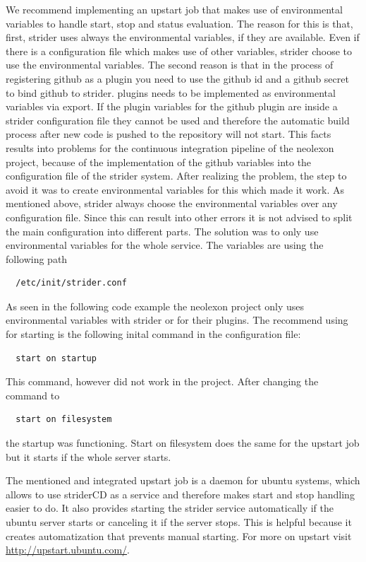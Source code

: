 We recommend implementing an upstart job that makes use of environmental variables to handle start, stop and status evaluation.
The reason for this is that, first, strider uses always the environmental variables, if they are available. Even if there is a configuration
file which makes use of other variables, strider choose to use the environmental variables. The second reason is that in the process of
registering github as a plugin you need to use the github id and a github secret to bind github to strider. plugins needs to be implemented
as environmental variables via export. If the plugin variables for the github plugin are inside a strider configuration file they cannot
be used and therefore the automatic build process after new code is pushed to the repository will not start. This facts results into problems
for the continuous integration pipeline of the neolexon project, because of the implementation of the github variables into the configuration
file of the strider system. After realizing the problem, the step to avoid it was to create environmental variables for this which made it work.
As mentioned above, strider always choose the environmental variables over any configuration file. Since this can result into other errors
it is not advised to split the main configuration into different parts. The solution was to only use environmental variables for the whole service.
The variables are using the following path

\begin{lstlisting}
  /etc/init/strider.conf
\end{lstlisting}

As seen in the following code example the neolexon project only uses environmental variables with strider or for their plugins. The recommend using
for starting is the following inital command in the configuration file:
\begin{lstlisting}
  start on startup
\end{lstlisting}
This command, however did not work in the project. After changing the command to
\begin{lstlisting}
  start on filesystem
\end{lstlisting}
the startup was functioning.
Start on filesystem does the same for the upstart job but it starts if the whole server starts.



The mentioned and integrated upstart job is a daemon for ubuntu systems, which allows to use striderCD as a service and therefore makes start and
stop handling easier to do. It also provides starting the strider service automatically if the ubuntu server starts or canceling it if the server
stops. This is helpful because it creates automatization that prevents manual starting. For more on upstart visit \url{http://upstart.ubuntu.com/}.

